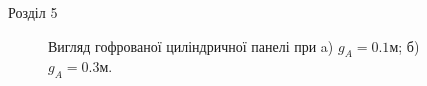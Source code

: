 \documentclass[8pt]{beamer}
\numberwithin{figure}{section}
\numberwithin{equation}{section}
\numberwithin{table}{section}
\begin{document}
\begin{frame}{Розділ 5}
\begin{figure}[h]
\begin{minipage}[h]{0.49\linewidth}
\end{minipage}
\hfill
\begin{minipage}[h]{0.49\linewidth}
\end{minipage}
\caption{Вигляд гофрованої циліндричної панелі при a) $g_A = 0.1м$; б) $g_A = 0.3м$.}
\end{figure}
\end{frame}
\end{document}

